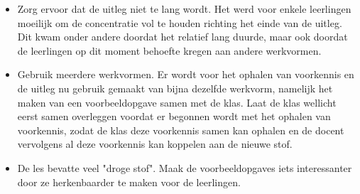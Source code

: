 \documentclass{article}
\begin{document}
                \begin{itemize}
                        \item Zorg ervoor dat de uitleg niet te lang wordt. Het werd voor enkele leerlingen moeilijk om de concentratie vol te houden richting het einde van de uitleg. Dit kwam onder andere doordat het relatief lang duurde, maar ook doordat de leerlingen op dit moment behoefte kregen aan andere werkvormen.
                        \item Gebruik meerdere werkvormen. Er wordt voor het ophalen van voorkennis en de uitleg nu gebruik gemaakt van bijna dezelfde werkvorm, namelijk het maken van een voorbeeldopgave samen met de klas. Laat de klas wellicht eerst samen overleggen voordat er begonnen wordt met het ophalen van voorkennis, zodat de klas deze voorkennis samen kan ophalen en de docent vervolgens al deze voorkennis kan koppelen aan de nieuwe stof.
                        \item De les bevatte veel "droge stof". Maak de voorbeeldopgaves iets interessanter door ze herkenbaarder te maken voor de leerlingen. 
                    \end{itemize}
                    

                    
\end{document}
